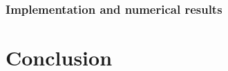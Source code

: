 \documentclass[a4paper]{book}
\theoremstyle{plain}
\begin{document}
\subsection{Implementation and numerical results} \label{sec:results}



\backmatter%
\chapter{Conclusion}

\printbibliography%
\end{document}
